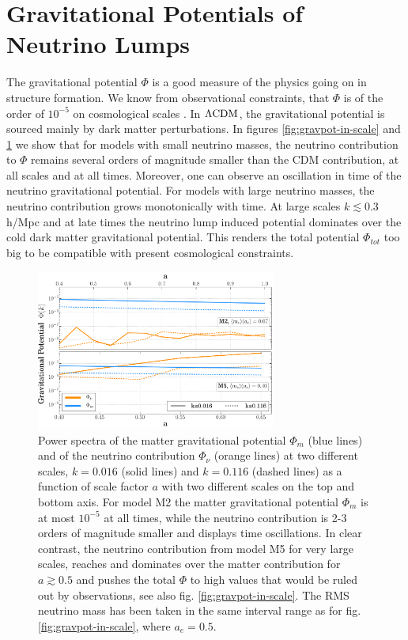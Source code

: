 \section{Gravitational Potentials of Neutrino Lumps \label{sec:GNQ-gravpot}}

The gravitational potential $\Phi$ is a good measure of the physics
going on in structure formation. We know from observational constraints,
that $\Phi$ is of the order of $10^{-5}$ on cosmological scales
\cite{pettorino_neutrino_2010,brouzakis_nonlinear_2011}. In $\Lambda\mathrm{CDM}$,
the gravitational potential is sourced mainly by dark matter perturbations.
In figures \ref{fig:gravpot-in-scale} and \ref{fig:gravpot-intime1}
we show that for models with small neutrino masses, the neutrino contribution
to $\Phi$ remains several orders of magnitude smaller than the CDM
contribution, at all scales and at all times. Moreover, one can observe
an oscillation in time of the neutrino gravitational potential. For
models with large neutrino masses, the neutrino contribution grows
monotonically with time. At large scales $k\lesssim0.3$h/Mpc and
at late times the neutrino lump induced potential dominates over the
cold dark matter gravitational potential. This renders the total potential
$\Phi_{tot}$ too big to be compatible with present cosmological constraints.
\begin{figure}
\centering{}\includegraphics[width=0.7\textwidth]{Chapters/gnq/figures/Phi-GravPotSpec-InTime-M2-and-M5-2scales-Phinu_Phim-new}
\caption[Power spectra of the matter gravitational
potential $\Phi_{m}$ and of the neutrino contribution
$\Phi_{\nu}$ for GNQ.]{\label{fig:gravpot-intime1} Power spectra of the matter gravitational
potential $\Phi_{m}$ (blue lines) and of the neutrino contribution
$\Phi_{\nu}$ (orange lines) at two different scales, $k=0.016$ (solid
lines) and $k=0.116$ (dashed lines) as a function of scale factor
$a$ with two different scales on the top and bottom axis. For model
M2 the matter gravitational potential $\Phi_{m}$ is at most $10^{-5}$
at all times, while the neutrino contribution is 2-3 orders of magnitude
smaller and displays time oscillations. In clear contrast, the neutrino
contribution from model M5 for very large scales, reaches and dominates
over the matter contribution for $a\gtrsim0.5$ and pushes the total
$\Phi$ to high values that would be ruled out by observations, see
also fig. \ref{fig:gravpot-in-scale}. The RMS neutrino mass has been
taken in the same interval range as for fig.\ref{fig:gravpot-in-scale},
where $a_{e}=0.5$.}
\end{figure}


